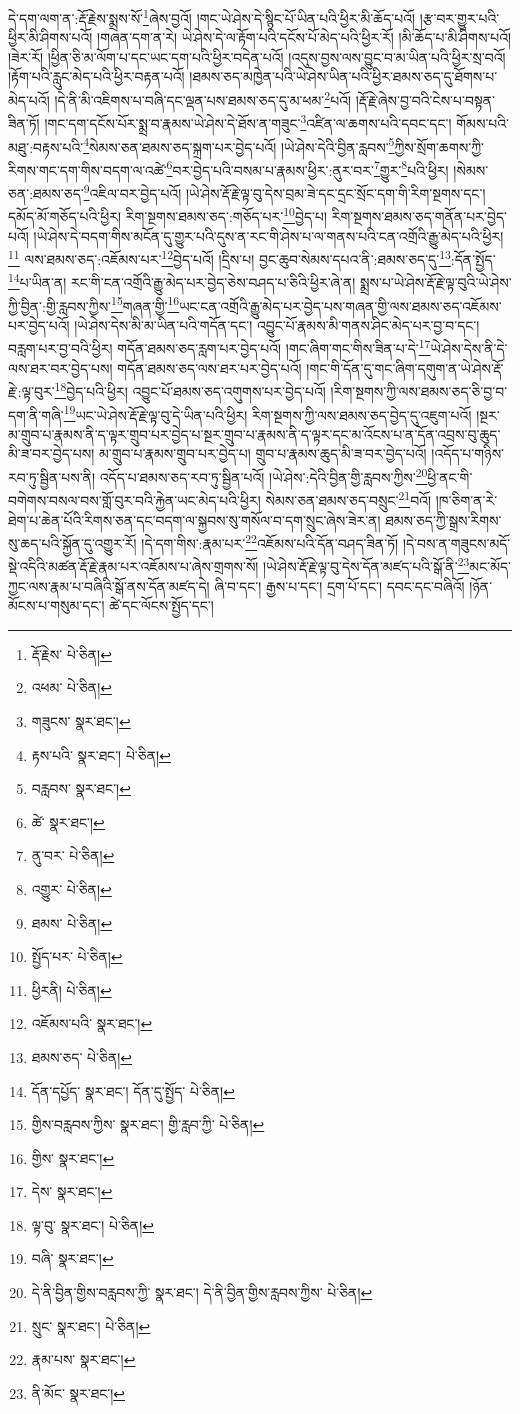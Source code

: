 དེ་དག་ལག་ན་:རྡོ་རྗེས་སྨྲས་སོ་\footnote{རྡོ་རྗེས་  པེ་ཅིན། }ཞེས་བྱའོ། །གང་ཡེ་ཤེས་དེ་སྙིང་པོ་ཡིན་པའི་ཕྱིར་མི་ཆོད་པའོ། །རྩ་བར་གྱུར་པའི་ཕྱིར་མི་ཤིགས་པའོ། །གཞན་དག་ན་རེ། ཡེ་ཤེས་དེ་ལ་རྟོག་པའི་དངོས་པོ་མེད་པའི་ཕྱིར་རོ། །མི་ཆོད་པ་མི་ཤིགས་པའོ། །ཟེར་རོ། །ཕྱིན་ཅི་མ་ལོག་པ་དང་ཡང་དག་པའི་ཕྱིར་བདེན་པའོ། །འདུས་བྱས་ལས་བྱུང་བ་མ་ཡིན་པའི་ཕྱིར་སྲ་བའོ། །རྟོག་པའི་རླུང་མེད་པའི་ཕྱིར་བརྟན་པའོ། །ཐམས་ཅད་མཁྱེན་པའི་ཡེ་ཤེས་ཡིན་པའི་ཕྱིར་ཐམས་ཅད་དུ་ཐོགས་པ་མེད་པའོ། །དེ་ནི་མི་འཇིགས་པ་བཞི་དང་ལྡན་པས་ཐམས་ཅད་དུ་མ་ཕམ་\footnote{འཕམ་  པེ་ཅིན། }པའོ། །རྡོ་རྗེ་ཞེས་བྱ་བའི་ངེས་པ་བསྟན་ཟིན་ཏོ། །གང་དག་དངོས་པོར་སྨྲ་བ་རྣམས་ཡེ་ཤེས་དེ་ཐོས་ན་གཟུང་\footnote{གཟུངས་  སྣར་ཐང་། }འཛིན་ལ་ཆགས་པའི་དབང་དང་། གོམས་པའི་མཐུ་:བརྟས་པའི་\footnote{རྟས་པའི་  སྣར་ཐང་།  པེ་ཅིན། }སེམས་ཅན་ཐམས་ཅད་སྐྲག་པར་བྱེད་པའོ། །ཡེ་ཤེས་དེའི་བྱིན་རླབས་\footnote{བརླབས་  སྣར་ཐང་། }ཀྱིས་སྲོག་ཆགས་ཀྱི་རིགས་གང་དག་གིས་བདག་ལ་འཚེ་\footnote{ཚེ་  སྣར་ཐང་། }བར་བྱེད་པའི་བསམ་པ་རྣམས་ཕྱིར་:ནུར་བར་\footnote{ནུ་བར་  པེ་ཅིན། }གྱུར་\footnote{འགྱུར་  པེ་ཅིན། }པའི་ཕྱིར། །སེམས་ཅན་:ཐམས་ཅད་\footnote{ཐམས་  པེ་ཅིན། }འཇིལ་བར་བྱེད་པའོ། །ཡེ་ཤེས་རྡོ་རྗེ་ལྟ་བུ་དེས་བྲམ་ཟེ་དང་དྲང་སྲོང་དག་གི་རིག་སྔགས་དང་། དམོད་མོ་གཅོད་པའི་ཕྱིར། རིག་སྔགས་ཐམས་ཅད་:གཅོད་པར་\footnote{སྤྱོད་པར་  པེ་ཅིན། }བྱེད་པ། རིག་སྔགས་ཐམས་ཅད་གནོན་པར་བྱེད་པའོ། །ཡེ་ཤེས་དེ་བདག་གིས་མངོན་དུ་གྱུར་པའི་དུས་ན་རང་གི་ཤེས་པ་ལ་གནས་པའི་ངན་འགྲོའི་རྒྱུ་མེད་པའི་ཕྱིར།\footnote{ཕྱིརནི།  པེ་ཅིན། } ལས་ཐམས་ཅད་:འཇོམས་པར་\footnote{འཇོམས་པའི་  སྣར་ཐང་། }བྱེད་པའོ། །དྲིས་པ། བྱང་ཆུབ་སེམས་དཔའ་ནི་:ཐམས་ཅད་དུ་\footnote{ཐམས་ཅད་  པེ་ཅིན། }:དོན་སྤྱོད་\footnote{དོན་དཔྱོད་  སྣར་ཐང་། དོན་དུ་སྤྱོད་  པེ་ཅིན། }པ་ཡིན་ན། རང་གི་ངན་འགྲོའི་རྒྱུ་མེད་པར་བྱེད་ཅེས་བཤད་པ་ཅིའི་ཕྱིར་ཞེ་ན། སྨྲས་པ་ཡེ་ཤེས་རྡོ་རྗེ་ལྟ་བུའི་ཡེ་ཤེས་ཀྱི་བྱིན་:གྱི་རླབས་ཀྱིས་\footnote{གྱིས་བརླབས་ཀྱིས་  སྣར་ཐང་། གྱི་རླབ་ཀྱི་  པེ་ཅིན། }གཞན་གྱི་\footnote{གྱིས་  སྣར་ཐང་། }ཡང་ངན་འགྲོའི་རྒྱུ་མེད་པར་བྱེད་པས་གཞན་གྱི་ལས་ཐམས་ཅད་འཇོམས་པར་བྱེད་པའོ། །ཡེ་ཤེས་དེས་མི་མ་ཡིན་པའི་གདོན་དང་། འབྱུང་པོ་རྣམས་མི་གནས་ཤིང་མེད་པར་བྱ་བ་དང་། བརླག་པར་བྱ་བའི་ཕྱིར། གདོན་ཐམས་ཅད་རླག་པར་བྱེད་པའོ། །གང་ཞིག་གང་གིས་ཟིན་པ་དེ་\footnote{དེས་  སྣར་ཐང་། }ཡེ་ཤེས་དེས་ནི་དེ་ལས་ཐར་བར་བྱེད་པས། གདོན་ཐམས་ཅད་ལས་ཐར་པར་བྱེད་པའོ། །གང་གི་དོན་དུ་གང་ཞིག་དགུག་ན་ཡེ་ཤེས་རྡོ་རྗེ་:ལྟ་བུར་\footnote{ལྟ་བུ་  སྣར་ཐང་།  པེ་ཅིན། }བྱེད་པའི་ཕྱིར། འབྱུང་པོ་ཐམས་ཅད་འགུགས་པར་བྱེད་པའོ། །རིག་སྔགས་ཀྱི་ལས་ཐམས་ཅད་ཅི་བྱ་བ་དག་ནི་གཞི་\footnote{བཞི་  སྣར་ཐང་། }ཡང་ཡེ་ཤེས་རྡོ་རྗེ་ལྟ་བུ་དེ་ཡིན་པའི་ཕྱིར། རིག་སྔགས་ཀྱི་ལས་ཐམས་ཅད་བྱེད་དུ་འཇུག་པའོ། །སྔར་མ་གྲུབ་པ་རྣམས་ནི་ད་ལྟར་གྲུབ་པར་བྱེད་པ་སྔར་གྲུབ་པ་རྣམས་ནི་ད་ལྟར་དང་མ་འོངས་པ་ན་དོན་འབྲས་བུ་ཆུད་མི་ཟ་བར་བྱེད་པས། མ་གྲུབ་པ་རྣམས་གྲུབ་པར་བྱེད་པ། གྲུབ་པ་རྣམས་ཆུད་མི་ཟ་བར་བྱེད་པའོ། །འདོད་པ་གཉིས་རབ་ཏུ་སྦྱིན་པས་ནི། འདོད་པ་ཐམས་ཅད་རབ་ཏུ་སྦྱིན་པའོ། །ཡེ་ཤེས་:དེའི་བྱིན་གྱི་རླབས་ཀྱིས་\footnote{དེ་ནི་བྱིན་གྱིས་བརླབས་ཀྱི་  སྣར་ཐང་། དེ་ནི་བྱིན་གྱིས་རླབས་ཀྱིས་  པེ་ཅིན། }ཕྱི་ནང་གི་བགེགས་བསལ་བས་གློ་བུར་བའི་རྐྱེན་ཡང་མེད་པའི་ཕྱིར། སེམས་ཅན་ཐམས་ཅད་བསྲུང་\footnote{སྲུང་  སྣར་ཐང་།  པེ་ཅིན། }བའོ། །ཁ་ཅིག་ན་རེ་ཐེག་པ་ཆེན་པོའི་རིགས་ཅན་དང་བདག་ལ་སྐྱབས་སུ་གསོལ་བ་དག་སྲུང་ཞེས་ཟེར་ན། ཐམས་ཅད་ཀྱི་སྒྲས་རིགས་སུ་ཆད་པའི་སྐྱོན་དུ་འགྱུར་རོ། །དེ་དག་གིས་:རྣམ་པར་\footnote{རྣམ་པས་  སྣར་ཐང་། }འཇོམས་པའི་དོན་བཤད་ཟིན་ཏོ། །དེ་བས་ན་གཟུངས་མདོ་སྡེ་འདིའི་མཚན་རྡོ་རྗེ་རྣམ་པར་འཇོམས་པ་ཞེས་གྲགས་སོ། །ཡེ་ཤེས་རྡོ་རྗེ་ལྟ་བུ་དེས་དོན་མཛད་པའི་སྒོ་ནི་\footnote{ནི་མོང་  སྣར་ཐང་། }མང་མོད་ཀྱང་ལས་རྣམ་པ་བཞིའི་སྒོ་ནས་དོན་མཛད་དེ། ཞི་བ་དང་། རྒྱས་པ་དང་། དྲག་པོ་དང་། དབང་དང་བཞིའོ། །ཉོན་མོངས་པ་གསུམ་དང་། ཚེ་དང་ལོངས་སྤྱོད་དང་། 